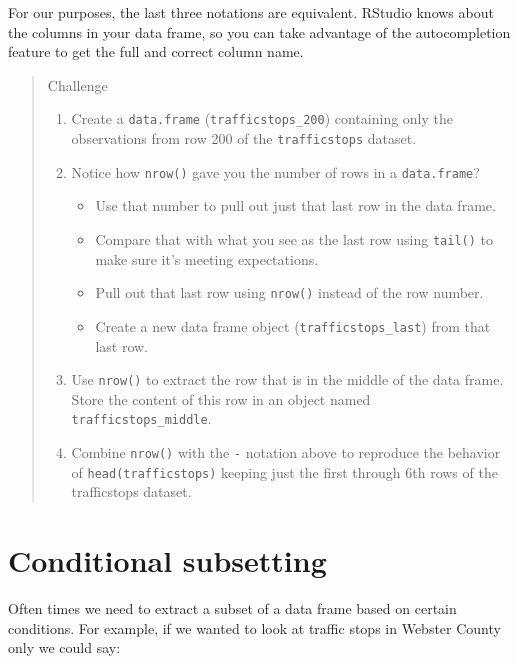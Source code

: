 \documentclass[]{book}
\providecommand{\tightlist}{%
  \setlength{\itemsep}{0pt}\setlength{\parskip}{0pt}}
\begin{document}
For our purposes, the last three notations are equivalent. RStudio knows
about the columns in your data frame, so you can take advantage of the
autocompletion feature to get the full and correct column name.

\begin{quote}
Challenge

\begin{enumerate}
\def\labelenumi{\arabic{enumi}.}
\item
  Create a \texttt{data.frame} (\texttt{trafficstops\_200}) containing
  only the observations from row 200 of the \texttt{trafficstops}
  dataset.
\item
  Notice how \texttt{nrow()} gave you the number of rows in a
  \texttt{data.frame}?

  \begin{itemize}
  \tightlist
  \item
    Use that number to pull out just that last row in the data frame.
  \item
    Compare that with what you see as the last row using \texttt{tail()}
    to make sure it's meeting expectations.
  \item
    Pull out that last row using \texttt{nrow()} instead of the row
    number.
  \item
    Create a new data frame object (\texttt{trafficstops\_last}) from
    that last row.
  \end{itemize}
\item
  Use \texttt{nrow()} to extract the row that is in the middle of the
  data frame. Store the content of this row in an object named
  \texttt{trafficstops\_middle}.
\item
  Combine \texttt{nrow()} with the \texttt{-} notation above to
  reproduce the behavior of \texttt{head(trafficstops)} keeping just the
  first through 6th rows of the trafficstops dataset.
\end{enumerate}
\end{quote}

\section{Conditional subsetting}\label{conditional-subsetting-1}

Often times we need to extract a subset of a data frame based on certain
conditions. For example, if we wanted to look at traffic stops in
Webster County only we could say:
\end{document}
